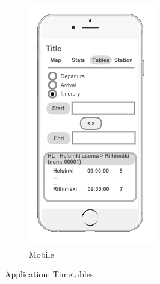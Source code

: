 \begin{figure}[ht]
\begin{subfigure}[b]{0.2\textwidth}
        \includegraphics[width=\textwidth]
          {img/c02-application/png/mobile-website-timetables.png}
        \caption{Mobile}
    \end{subfigure}
    \caption{Application: Timetables}
\end{figure}
